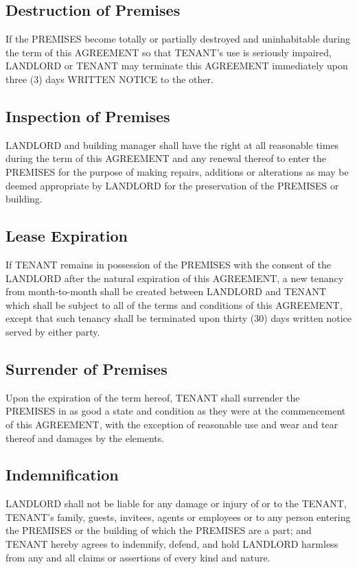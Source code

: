 \documentclass[11pt]{article}
\begin{document}
\subsection*{Destruction of Premises}
\label{sec:orgb660c47}
If the PREMISES become totally or partially destroyed and
uninhabitable during the term of this AGREEMENT so that TENANT's use
is seriously impaired, LANDLORD or TENANT may terminate this AGREEMENT
immediately upon three (3) days WRITTEN NOTICE to the other.

\subsection*{Inspection of Premises}
\label{sec:orgcf5e737}
LANDLORD and building manager shall have the right at all reasonable
times during the term of this AGREEMENT and any renewal thereof to
enter the PREMISES for the purpose of making repairs, additions or
alterations as may be deemed appropriate by LANDLORD for the
preservation of the PREMISES or building.

\subsection*{Lease Expiration}
\label{sec:org12c48a6}
If TENANT remains in possession of the PREMISES with the consent of
the LANDLORD after the natural expiration of this AGREEMENT, a new
tenancy from month-to-month shall be created between LANDLORD and
TENANT which shall be subject to all of the terms and conditions of
this AGREEMENT, except that such tenancy shall be terminated upon
thirty (30) days written notice served by either party.

\subsection*{Surrender of Premises}
\label{sec:org1ae27d9}
Upon the expiration of the term hereof, TENANT shall surrender the
PREMISES in as good a state and condition as they were at the
commencement of this AGREEMENT, with the exception of reasonable use
and wear and tear thereof and damages by the elements.

\subsection*{Indemnification}
\label{sec:org9def44b}
LANDLORD shall not be liable for any damage or injury of or to the
TENANT, TENANT's family, guests, invitees, agents or employees or to
any person entering the PREMISES or the building of which the PREMISES
are a part; and TENANT hereby agrees to indemnify, defend, and hold
LANDLORD harmless from any and all claims or assertions of every kind
and nature.
\end{document}
